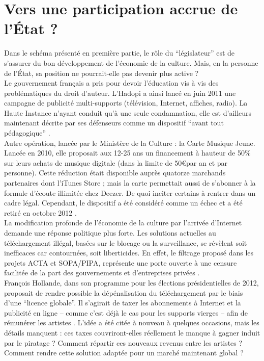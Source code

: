 \documentclass[a4paper]{report}
\begin{document}
	\section{Vers une participation accrue de l'État ?}
	Dans le schéma présenté en première partie, le rôle du ``législateur'' est de s'assurer du bon développement de l'économie de la culture. Mais, en la personne de l'État, sa position ne pourrait-elle pas devenir plus active ?\\

	Le gouvernement français a pris pour devoir l'éducation vis à vis des problématiques du droit d'auteur. L'Hadopi a ainsi lancé en juin 2011 une campagne de publicité multi-supports (télévision, Internet, affiches, radio). La Haute Instance n'ayant conduit qu'à une seule condamnation, elle est d'ailleurs maintenant décrite par ses défenseurs comme un dispositif ``avant tout pédagogique'' \cite{podcast-industrie-musicale}.\\

	Autre opération, lancée par le Ministère de la Culture : la Carte Musique Jeune. Lancée en 2010, elle proposait aux 12-25 ans un financement à hauteur de 50\% sur leurs achats de musique digitale (dans la limite de 50\euro par an et par personne). Cette réduction était disponible auprès quatorze marchands partenaires dont l'iTunes Store ; mais la carte permettait aussi de s'abonner à la formule d'écoute illimitée chez Deezer. De quoi inciter certains à rentrer dans un cadre légal. Cependant, le dispositif a été considéré comme un échec \cite{carte-musique-jeune-echec} et a été retiré en octobre 2012 \cite{carte-musique-jeune-arret}.\\

	La modification profonde de l'économie de la culture par l'arrivée d'Internet demande une réponse politique plus forte. Les solutions actuelles au téléchargement illégal, basées sur le blocage ou la surveillance, se révèlent soit inefficaces car contournées, soit liberticides. En effet, le filtrage proposé dans les projets ACTA et SOPA/PIPA, représente une porte ouverte à une censure facilitée de la part des gouvernements et d'entreprises privées \cite{quadrature-filtrage}.\\

	François Hollande, dans son programme pour les élections présidentielles de 2012, proposait de rendre possible la dépénalisation du téléchargement par le biais d'une ``licence globale''. Il s'agirait de taxer les abonnements à Internet et la publicité en ligne – comme c'est déjà le cas pour les supports vierges – afin de rémunérer les artistes \cite{licence-gloable}. L'idée a été citée à nouveau à quelques occasions, mais les détails manquent : ces taxes couvriront-elles réellement le manque à gagner induit par le piratage ? Comment répartir ces nouveaux revenus entre les artistes ? Comment rendre cette solution adaptée pour un marché maintenant global ?\\
\end{document}
